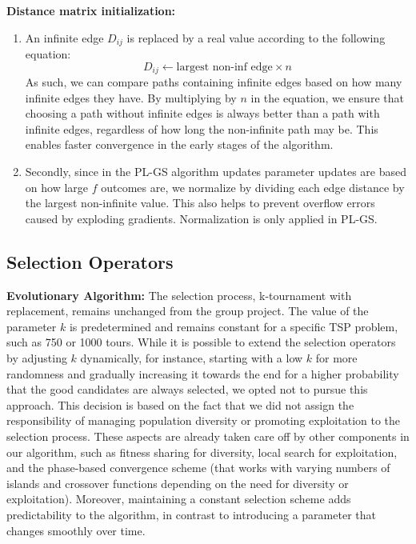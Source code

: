 \documentclass[a4paper,10pt]{article}
\newcommand{\ReplaceMe}[1]{{\color{blue}#1}}
\begin{document}
		
	\textbf{Distance matrix initialization:} 
	\begin{enumerate}
	\item An infinite edge $D_{ij}$ is replaced by a real value according to the following equation:
	$$D_{ij} \leftarrow \text{largest non-inf edge} \times n $$
	As such, we can compare paths containing infinite edges based on how many infinite edges they have. By multiplying by $n$ in the equation, we ensure that choosing a path without infinite edges is always better than a path with infinite edges, regardless of how long the non-infinite path may be. This enables faster convergence in the early stages of the algorithm.
	\item Secondly, since in the PL-GS algorithm updates parameter updates are based on how large $f$ outcomes are, we normalize by dividing each edge distance by the largest non-infinite value. This also helps to prevent overflow errors caused by exploding gradients. Normalization is only applied in PL-GS.	
	\end{enumerate}




\subsection{Selection Operators}

	\textbf{Evolutionary Algorithm:}
	The selection process, k-tournament with replacement, remains unchanged from the group project. The value of the parameter $k$ is predetermined and remains constant for a specific TSP problem, such as 750 or 1000 tours. While it is possible to extend the selection operators by adjusting $k$ dynamically, for instance, starting with a low $k$ for more randomness and gradually increasing it towards the end for a higher probability that the good candidates are always selected, we opted not to pursue this approach. This decision is based on the fact that we did not assign the responsibility of managing population diversity or promoting exploitation to the selection process. These aspects are already taken care off by other components in our algorithm, such as fitness sharing for diversity, local search for exploitation, and the phase-based convergence scheme (that works with varying numbers of islands and crossover functions depending on the need for diversity or exploitation). Moreover, maintaining a constant selection scheme adds predictability to the algorithm, in contrast to introducing a parameter that changes smoothly over time.
\end{document}
